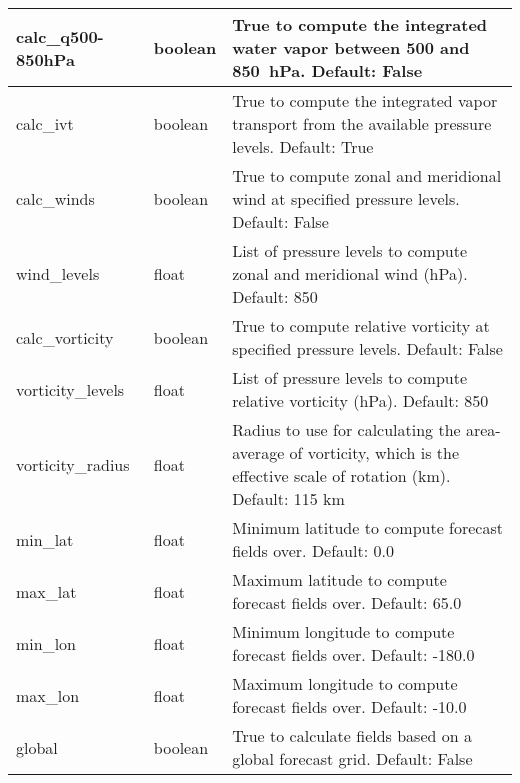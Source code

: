 \documentclass[psfig,12pt]{article}
\begin{document}
\begin{table}[H]
\begin{center}
\begin{tabular}{|p{1.60in}|p{0.5in}|p{4.15in}|}
calc\_q500-850hPa & boolean & True to compute the integrated water vapor between 500 and 
850~hPa.  Default:  False \\ \hline

calc\_ivt & boolean & True to compute the integrated vapor transport from the available pressure
levels.  Default:  True \\ \hline

calc\_winds & boolean & True to compute zonal and meridional wind at specified pressure levels.
Default:  False \\ \hline

wind\_levels & float & List of pressure levels to compute zonal and meridional wind (hPa).
Default:  850 \\ \hline

calc\_vorticity & boolean & True to compute relative vorticity at specified pressure levels.
Default:  False \\ \hline

vorticity\_levels & float & List of pressure levels to compute relative vorticity (hPa).
Default:  850 \\ \hline

vorticity\_radius & float & Radius to use for calculating the area-average of vorticity,
which is the effective scale of rotation (km).  Default: 115 km \\ \hline  

min\_lat & float & Minimum latitude to compute forecast fields over.  Default:  0.0 \\ \hline

max\_lat & float & Maximum latitude to compute forecast fields over.  Default:  65.0 \\ \hline

min\_lon & float & Minimum longitude to compute forecast fields over.  Default:  -180.0 \\ \hline

max\_lon & float & Maximum longitude to compute forecast fields over.  Default:  -10.0 \\ \hline

global & boolean & True to calculate fields based on a global forecast grid.  Default:  False \\ \hline

\end{tabular}
\end{center}
\end{table}
\end{document}
